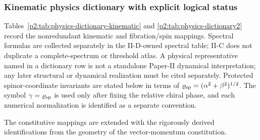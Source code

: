 \documentclass[12pt,a4paper]{article}
\begin{document}
\subsubsection{Kinematic physics dictionary with explicit logical status} 
\label{p2:sec:physics-dictionary}
Tables~\ref{p2:tab:physics-dictionary-kinematic} and
\ref{p2:tab:physics-dictionary2} record the nonredundant kinematic and
fibration/spin mappings.  Spectral formulas are collected separately in
the II-D-owned spectral table; II-C does not duplicate a complete-spectrum or
threshold atlas.  A
physical representative named in a dictionary row is not a standalone
Paper-II dynamical interpretation; any later structural or dynamical
realization must be cited separately.  Protected spinor-coordinate invariants are stated below
in terms of \(\varrho_{\rm sp}=(\alpha^2+\beta^2)^{1/2}\).  The symbol
\(\gamma=\varrho_{\rm sp}\) is used only after fixing the relative chiral
phase, and each numerical normalization is identified as a separate
convention.


The constitutive mappings are extended with the rigorously derived identifications from the geometry of the vector-momentum constitution.
\end{document}
